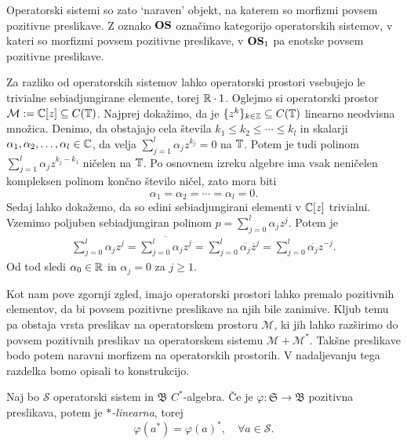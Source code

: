 Operatorski sistemi so zato `naraven' objekt, na katerem so morfizmi povsem pozitivne preslikave.
Z oznako $\mathbf{OS}$ označimo kategorijo operatorskih sistemov, v kateri so morfizmi povsem pozitivne preslikave,
v $\mathbf{OS}_1$ pa enotske povsem pozitivne preslikave.

\begin{zgled}
    Za razliko od operatorskih sistemov lahko operatorski prostori vsebujejo le trivialne sebiadjungirane elemente, torej $\mathbb R \cdot 1$.
    Oglejmo si operatorski prostor $\mathcal{M} := \mathbb C [z] \subseteq C(\mathbb T)$.
    Najprej dokažimo, da je $\{z^k\}_{k \in \mathbb Z} \subseteq C(\mathbb T)$ linearno neodvisna množica.
    Denimo, da obstajajo cela števila $k_1 \leq k_2 \leq \cdots \leq k_l$ in skalarji $\alpha_1, \alpha_2, \dots, \alpha_l \in \mathbb C$,
    da velja $\sum_{j = 1} ^l \alpha_j z^{k_j} = 0$ na $\mathbb T$. Potem je tudi polinom 
    $\sum_{j = 1} ^l \alpha_j z^{k_j - k_1}$ ničelen na $\mathbb T$. Po osnovnem izreku algebre 
    ima vsak neničelen kompleksen polinom končno število ničel, zato mora biti $$\alpha_1 = \alpha_2 = \cdots = \alpha_l = 0.$$
    Sedaj lahko dokažemo, da so edini sebiadjungirani elementi v $\mathbb C[z]$ trivialni.
    Vzemimo poljuben sebiadjungiran polinom $p = \sum_{j = 0} ^l \alpha_j z^j$. Potem je
    \begin{align*}
        \sum_{j = 0} ^l \alpha_j z^j = \overline{\sum_{j = 0} ^l \alpha_j z^j} = \sum_{j = 0} ^l \overline{\alpha_j} \overline{z}^j = \sum_{j = 0} ^l \overline{\alpha_j} z^{-j}.
    \end{align*} 
    Od tod sledi $\alpha_0 \in \mathbb R$ in $\alpha_j = 0$ za $j \geq 1$.
\end{zgled}

Kot nam pove zgornji zgled, imajo operatorski prostori lahko premalo 
pozitivnih elementov, da bi povsem pozitivne preslikave na njih bile zanimive.
Kljub temu pa obstaja vrsta preslikav
na operatorskem prostoru $\mathcal{M}$, ki jih lahko razširimo do povsem pozitivnih preslikav na operatorskem sistemu $\mathcal{M} + \mathcal{M}^*$.
Takšne preslikave bodo potem naravni morfizem na operatorskih prostorih.
V nadaljevanju tega razdelka bomo opisali to konstrukcijo.

\begin{lema}
    Naj bo $\mathcal{S}$ operatorski sistem in $\mathfrak{B}$ $C^*$-algebra.
    Če je $\varphi: \mathfrak{S} \to \mathfrak{B}$ pozitivna preslikava, potem je \emph{$*$-linearna}, torej
    $$\varphi(a^*) = \varphi(a) ^*,\quad \forall a \in \mathcal{S}.$$
\end{lema}


